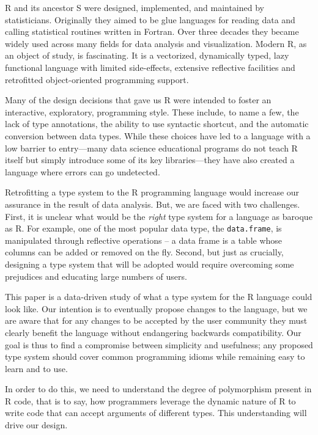\documentclass[acmsmall,review,anonymous]{acmart}\settopmatter{printfolios=true,printccs=false,printacmref=false}
\newcommand{\code}[1]{{\lstinline[style=Rin]!#1!}\xspace}
\begin{document}
R and its ancestor S were designed, implemented, and maintained by
statisticians. Originally they aimed to be glue languages for reading data
and calling statistical routines written in Fortran. Over three decades they
became widely used across many fields for data analysis and visualization.
Modern R, as an object of study, is fascinating. It is a vectorized,
dynamically typed, lazy functional language with limited side-effects,
extensive reflective facilities and retrofitted object-oriented programming
support.

Many of the design decisions that gave us R were intended to foster an
interactive, exploratory, programming style. These include, to name a few,
the lack of type annotations, the ability to use syntactic shortcut, and the
automatic conversion between data types.  While these choices have led to a
language with a low barrier to entry---many data science educational
programs do not teach R itself but simply introduce some of its key
libraries---they have also created a language where errors can go
undetected.

Retrofitting a type system to the R programming language would increase our
assurance in the result of data analysis. But, we are faced with two
challenges. First, it is unclear what would be the \emph{right} type system
for a language as baroque as R. For example, one of the most popular data
type, the \code{data.frame}, is manipulated through reflective operations --
a data frame is a table whose columns can be added or removed on the fly.
Second, but just as crucially, designing a type system that will be adopted
would require overcoming some prejudices and educating large numbers of
users.

This paper is a data-driven study of what a type system for the R language
could look like. Our intention is to eventually propose changes to the
language, but we are aware that for any changes to be accepted by the user
community they must clearly benefit the language without endangering
backwards compatibility. Our goal is thus to find a compromise between
simplicity and usefulness; any proposed type system should cover common
programming idioms while remaining easy to learn and to use.




In order to do this, we need to understand the degree of polymorphism
present in R code, that is to say, how programmers leverage the dynamic
nature of R to write code that can accept arguments of different types.
This understanding will drive our design.
\end{document}
